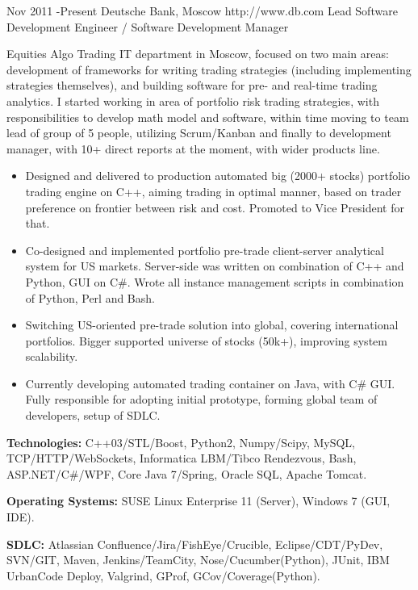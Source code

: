 \documentclass[10pt]{article} %
\begin{document}
\job
{Nov 2011 -}{Present}
{Deutsche Bank, Moscow}
{http://www.db.com}
{Lead Software Development Engineer / Software Development Manager}
{Equities Algo Trading IT department in Moscow, focused on two main areas: development of frameworks for
writing trading strategies (including implementing strategies themselves), and building software 
for pre- and real-time  trading analytics. I started working in area of portfolio risk trading strategies,
with responsibilities to develop math model and software, within time moving to team lead of group of 5 people,
utilizing Scrum/Kanban and finally to development manager, with 10+ direct reports at the moment,
with wider products line.
\begin{itemize}
\item{Designed and delivered to production automated big (2000+ stocks) portfolio trading engine on C++,
aiming trading in optimal manner, based on trader preference on frontier between risk and cost. 
Promoted to Vice President for that.}
\item{Co-designed and implemented portfolio pre-trade client-server analytical system for US markets.
Server-side was written on combination of C++ and Python, GUI on C\#. Wrote all instance management scripts
in combination of Python, Perl and Bash.}
\item{Switching US-oriented pre-trade solution into global, covering international portfolios.
Bigger supported universe of stocks (50k+), improving system scalability.}
\item{Currently developing automated trading container on Java, with C\# GUI. Fully responsible for
adopting initial prototype, forming global team of developers, setup of SDLC.}
\end{itemize}
\rule{0mm}{5mm}\textbf{Technologies:} C++03/STL/Boost, Python2, Numpy/Scipy, MySQL, TCP/HTTP/WebSockets,
Informatica LBM/Tibco Rendezvous, Bash, ASP.NET/C\#/WPF, Core Java 7/Spring, Oracle SQL, Apache Tomcat.\\
\rule{0mm}{5mm}\textbf{Operating Systems:} SUSE Linux Enterprise 11 (Server), Windows 7 (GUI, IDE).\\
\rule{0mm}{5mm}\textbf{SDLC:} Atlassian Confluence/Jira/FishEye/Crucible, Eclipse/CDT/PyDev, SVN/GIT,
Maven, Jenkins/TeamCity, Nose/Cucumber(Python), JUnit, IBM UrbanCode Deploy, Valgrind, GProf, GCov/Coverage(Python).
}

\end{document}
